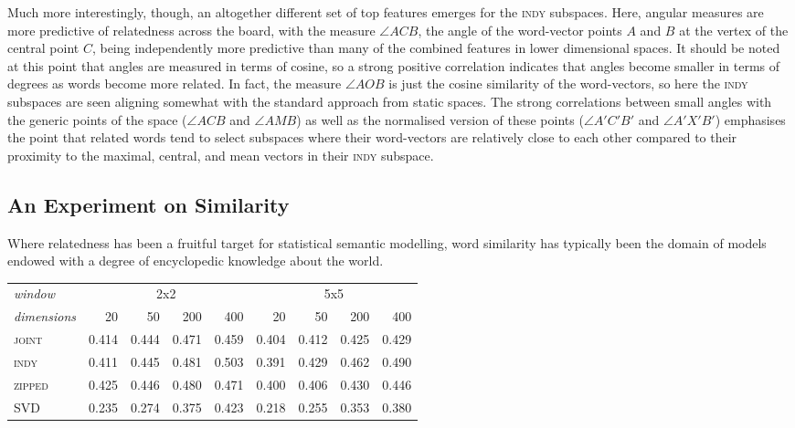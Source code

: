 Much more interestingly, though, an altogether different set of top features emerges for the \textsc{indy} subspaces.  Here, angular measures are more predictive of relatedness across the board, with the measure $\angle ACB$, the angle of the word-vector points $A$ and $B$ at the vertex of the central point $C$, being independently more predictive than many of the combined features in lower dimensional spaces.  It should be noted at this point that angles are measured in terms of cosine, so a strong positive correlation indicates that angles become smaller in terms of degrees as words become more related.  In fact, the measure $\angle AOB$ is just the cosine similarity of the word-vectors, so here the \textsc{indy} subspaces are seen aligning somewhat with the standard approach from static spaces.  The strong correlations between small angles with the generic points of the space ($\angle ACB$ and $\angle AMB$) as well as the normalised version of these points ($\angle A'C'B'$ and $\angle A'X'B'$) emphasises the point that related words tend to select subspaces where their word-vectors are relatively close to each other compared to their proximity to the maximal, central, and mean vectors in their \textsc{indy} subspace.

\subsection{An Experiment on Similarity}
Where relatedness has been a fruitful target for statistical semantic modelling, word similarity has typically been the domain of models endowed with a degree of encyclopedic knowledge about the world.

\begin{table}
\centering
\begin{tabular}{lrrrrrrrr}
\hline
\emph{window} & \multicolumn{4}{c}{2x2} & \multicolumn{4}{c}{5x5} \\
\emph{dimensions} & 20 & 50 & 200 & 400 & 20 & 50 & 200 & 400 \\
\hline
\textsc{joint} & 0.414 & 0.444 & 0.471 & 0.459 & 0.404 & 0.412 & 0.425 & 0.429 \\
\textsc{indy} & 0.411 & 0.445 & 0.481 & 0.503 & 0.391 & 0.429 & 0.462 & 0.490 \\
\textsc{zipped} & 0.425 & 0.446 & 0.480 & 0.471 & 0.400 & 0.406 & 0.430 & 0.446 \\
\textsc{SVD} & 0.235 & 0.274 & 0.375 & 0.423 & 0.218 & 0.255 & 0.353 & 0.380 \\
\hline
\end{tabular}
\end{table}

